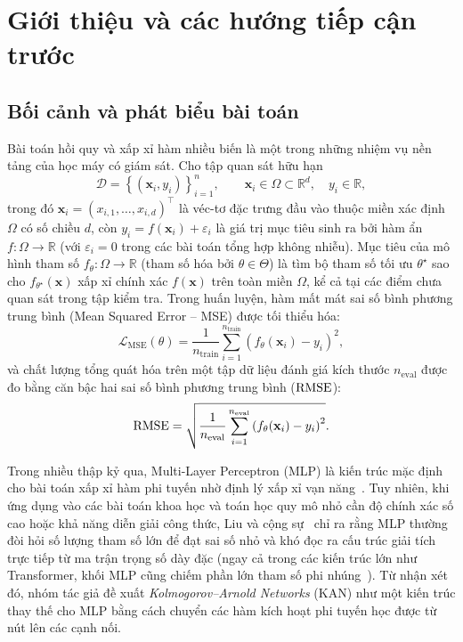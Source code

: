 \chapter{Giới thiệu và các hướng tiếp cận trước}
\label{ch:introduction}

\section{Bối cảnh và phát biểu bài toán}
Bài toán hồi quy và xấp xỉ hàm nhiều biến là một trong những nhiệm vụ nền tảng của học máy có giám sát. Cho tập quan sát hữu hạn
\begin{equation}\label{eq:dataset}
\mathcal{D} = \left\{(\mathbf{x}_i, y_i)\right\}_{i=1}^{n}, \qquad \mathbf{x}_i \in \Omega \subset \mathbb{R}^{d}, \quad y_i \in \mathbb{R},
\end{equation}
trong đó $\mathbf{x}_i = (x_{i,1}, \dots, x_{i,d})^\top$ là véc-tơ đặc trưng đầu vào thuộc miền xác định $\Omega$ có số chiều $d$, còn $y_i = f(\mathbf{x}_i) + \varepsilon_i$ là giá trị mục tiêu sinh ra bởi hàm ẩn $f : \Omega \to \mathbb{R}$ (với $\varepsilon_i = 0$ trong các bài toán tổng hợp không nhiễu). Mục tiêu của mô hình tham số $f_\theta : \Omega \to \mathbb{R}$ (tham số hóa bởi $\theta \in \Theta$) là tìm bộ tham số tối ưu $\theta^\star$ sao cho $f_{\theta^\star}(\mathbf{x})$ xấp xỉ chính xác $f(\mathbf{x})$ trên toàn miền $\Omega$, kể cả tại các điểm chưa quan sát trong tập kiểm tra. Trong huấn luyện, hàm mất mát sai số bình phương trung bình (Mean Squared Error -- MSE) được tối thiểu hóa:
\begin{equation}\label{eq:intro-mse}
\mathcal{L}_{\mathrm{MSE}}(\theta) = \frac{1}{n_{\mathrm{train}}}\sum_{i=1}^{n_{\mathrm{train}}}\left(f_\theta(\mathbf{x}_i) - y_i\right)^2,
\end{equation}
và chất lượng tổng quát hóa trên một tập dữ liệu đánh giá kích thước $n_{\mathrm{eval}}$ được đo bằng căn bậc hai sai số bình phương trung bình ($\operatorname{RMSE}$):
\begin{equation}\label{eq:intro-rmse}
\operatorname{RMSE} = \sqrt{\frac{1}{n_{\mathrm{eval}}}\sum_{i=1}^{n_{\mathrm{eval}}}\left(f_\theta(\mathbf{x}_i) - y_i\right)^2}.
\end{equation}

Trong nhiều thập kỷ qua, Multi-Layer Perceptron (MLP) là kiến trúc mặc định cho bài toán xấp xỉ hàm phi tuyến nhờ định lý xấp xỉ vạn năng~\cite{cybenko1989approximation,hornik1989multilayer}. Tuy nhiên, khi ứng dụng vào các bài toán khoa học và toán học quy mô nhỏ cần độ chính xác số cao hoặc khả năng diễn giải công thức, Liu và cộng sự~\cite{liu2025kan} chỉ ra rằng MLP thường đòi hỏi số lượng tham số lớn để đạt sai số nhỏ và khó đọc ra cấu trúc giải tích trực tiếp từ ma trận trọng số dày đặc (ngay cả trong các kiến trúc lớn như Transformer, khối MLP cũng chiếm phần lớn tham số phi nhúng~\cite{vaswani2017attention,liu2025kan}). Từ nhận xét đó, nhóm tác giả đề xuất \emph{Kolmogorov--Arnold Networks} (KAN) như một kiến trúc thay thế cho MLP bằng cách chuyển các hàm kích hoạt phi tuyến học được từ nút lên các cạnh nối.

